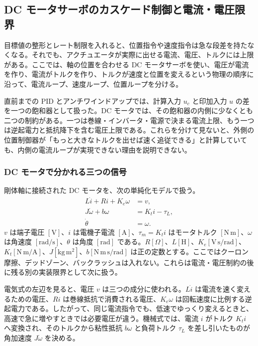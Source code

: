 \subsection{DC モータサーボのカスケード制御と電流・電圧限界}

目標値の整形とレート制限を入れると、位置指令や速度指令は急な段差を持たなくなる。それでも、アクチュエータが実際に出せる電流、電圧、トルクには上限がある。ここでは、軸の位置を合わせる DC モータサーボを使い、電圧が電流を作り、電流がトルクを作り、トルクが速度と位置を変えるという物理の順序に沿って、電流ループ、速度ループ、位置ループを分ける。

直前までの PID とアンチワインドアップでは、計算入力 $u_c$ と印加入力 $u$ の差を一つの飽和器として扱った。DC モータでは、その飽和器の内側に少なくとも二つの制約がある。一つは巻線・インバータ・電源で決まる電流上限、もう一つは逆起電力と抵抗降下を含む電圧上限である。これらを分けて見ないと、外側の位置制御器が「もっと大きなトルクを出せば速く追従できる」と計算していても、内側の電流ループが実現できない理由を説明できない。

\subsubsection{DC モータで分かれる三つの信号}

剛体軸に接続された DC モータを、次の単純化モデルで扱う。
\begin{align}
  L\dot{i}+Ri+K_e\omega&=v,\\
  J\dot{\omega}+b\omega&=K_t i-\tau_L,\\
  \dot{\theta}&=\omega.
  \label{eq:cascade-dc-motor}
\end{align}
$v$ は端子電圧 $[\mathrm{V}]$、$i$ は電機子電流 $[\mathrm{A}]$、$\tau_m=K_t i$ はモータトルク $[\mathrm{N\,m}]$、$\omega$ は角速度 $[\mathrm{rad/s}]$、$\theta$ は角度 $[\mathrm{rad}]$ である。$R[\Omega]$、$L[\mathrm{H}]$、$K_e[\mathrm{V\,s/rad}]$、$K_t[\mathrm{N\,m/A}]$、$J[\mathrm{kg\,m^2}]$、$b[\mathrm{N\,m\,s/rad}]$ は正の定数とする。ここではクーロン摩擦、デッドゾーン、バックラッシュは入れない。これらは電流・電圧制約の後に残る別の実装限界として次に扱う。

電気式の左辺を見ると、電圧 $v$ は三つの成分に使われる。$L\dot{i}$ は電流を速く変えるための電圧、$Ri$ は巻線抵抗で消費される電圧、$K_e\omega$ は回転速度に比例する逆起電力である。したがって、同じ電流指令でも、低速でゆっくり変えるときと、高速で急に増やすときでは必要電圧が違う。機械式では、電流 $i$ がトルク $K_t i$ へ変換され、そのトルクから粘性抵抗 $b\omega$ と負荷トルク $\tau_L$ を差し引いたものが角加速度 $J\dot{\omega}$ を決める。

